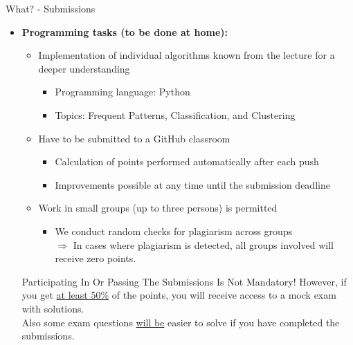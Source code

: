 \begin{frame}{What? - Submissions}
	\begin{itemize}
		\item \textbf{Programming tasks (to be done at home):}
		      \begin{itemize}
			      \item Implementation of individual algorithms known from the lecture for a deeper understanding \\
			            \begin{itemize}
				            \item Programming language: Python
				            \item Topics: Frequent Patterns, Classification, and Clustering
			            \end{itemize}
			      \item Have to be submitted to a GitHub classroom
			            \begin{itemize}
				            \item Calculation of points performed automatically after each push
				            \item Improvements possible at any time until the submission deadline
			            \end{itemize}
			      \item Work in small groups (up to three persons) is permitted
			            \begin{itemize}
				            \item We conduct random checks for plagiarism across groups \\
				                  $\Rightarrow$ In cases where plagiarism is detected, all groups involved will receive zero points.
			            \end{itemize}
		      \end{itemize}
		      \begin{block}{Participating In Or Passing The Submissions Is Not Mandatory!}
			      However, if you get \underline{at least 50\%} of the points, you will receive access to a mock exam with solutions. \\
			      Also some exam questions \underline{will be} easier to solve if you have completed the submissions.
		      \end{block}
	\end{itemize}
\end{frame}

